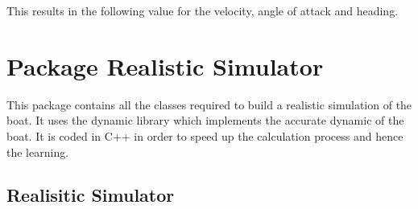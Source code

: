 \documentclass[letterpaper,10pt,english]{sphinxmanual}
\let\sphinxpxdimen\pdfpxdimen\else\newdimen\sphinxpxdimen
\begin{document}
This results in the following value for the velocity, angle of attack and heading.

\noindent{\hspace*{\fill}\scalebox{3.000000}{\sphinxincludegraphics[width=200\sphinxpxdimen,height=200\sphinxpxdimen]{{Figure_1}.png}}\hspace*{\fill}}


\section{Package Realistic Simulator}
\label{\detokenize{package1bis:package-realistic-simulator}}\label{\detokenize{package1bis::doc}}
This package contains all the classes required to build a realistic simulation of the boat. It uses the dynamic library  which implements the accurate dynamic of the boat. It is coded in C++ in order to speed up the calculation process and hence the learning.


\subsection{Realisitic Simulator}
\label{\detokenize{package1bis:module-Simulator_realistic}}\label{\detokenize{package1bis:realisitic-simulator}}
\end{document}
